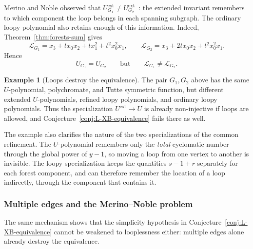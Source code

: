 \documentclass[11pt]{article}
\theoremstyle{plain}
\theoremstyle{definition}
\newtheorem{example}[theorem]{Example}
\renewcommand{\mathcal}{\mathscr}
\newcommand{\LL}{\mathcal{L}}    %
\newcommand{\ext}{\mathrm{ext}}
\numberwithin{equation}{section}
\begin{document}
Merino and Noble observed that
$U_{G_1}^{\ext}\ne U_{G_2}^{\ext}$~\cite{MN}: the extended
invariant remembers to which component the loop belongs in each spanning
subgraph.  The ordinary loopy polynomial also retains enough of this
information.  Indeed, Theorem~\ref{thm:forests-sum} gives
\begin{equation}\label{eq:looped-P3-L}
   \LL_{G_1}
   =x_3+t x_0x_2+t x_1^2+t^2x_0^2x_1,
   \qquad
   \LL_{G_2}
   =x_3+2t x_0x_2+t^2x_0^2x_1.
\end{equation}
Hence
\[
   U_{G_1}=U_{G_2}
   \qquad\text{but}\qquad
   \LL_{G_1}\ne\LL_{G_2}.
\]

\begin{example}[Loops destroy the equivalence]
\label{ex:loop-necessary}
The pair $G_1,G_2$ above has the same $U$-polynomial,
polychromate, and Tutte symmetric function, but different extended
$U$-polynomials, refined loopy polynomials, and ordinary loopy polynomials.
Thus the specialization $U^{\ext}\to U$ is already non-injective if loops are allowed, and Conjecture~\ref{conj:L-XB-equivalence} fails there as well.
\end{example}

The example also clarifies the nature of the two specializations of the common refinement.
The $U$-polynomial remembers only the \emph{total} cyclomatic number through the
global power of $y-1$, so moving a loop from one vertex to another is invisible.
The loopy specialization keeps the quantities $s-1+r$ separately for each forest component,
and can therefore remember the location of a loop indirectly, through the component that contains it.

\subsubsection{Multiple edges and the Merino--Noble problem}
\label{subsubsec:multiple-edges}

The same mechanism shows that the simplicity hypothesis in
Conjecture~\ref{conj:L-XB-equivalence} cannot be weakened to looplessness either:
multiple edges alone already destroy the equivalence.
\end{document}
